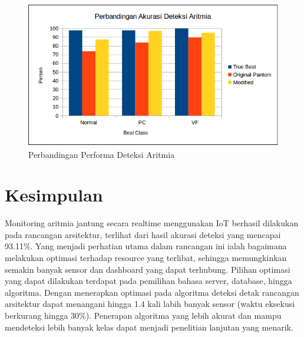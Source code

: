 \documentclass[]{indojc}
\begin{document}
\begin{figure}[H]
\centerline{\includegraphics[scale=0.41]{images/aritmia_acc.png}}
\caption{Perbandingan Performa Deteksi Aritmia}
\label{fig:aritmia_acc}
\end{figure}

\section{Kesimpulan}
Monitoring aritmia jantung secara realtime menggunakan IoT berhasil dilakukan pada rancangan arsitektur, terlihat dari hasil akurasi deteksi yang mencapai 93.11\%. Yang menjadi perhatian utama dalam rancangan ini ialah bagaimana melakukan optimasi terhadap resource yang terlibat, sehingga memungkinkan semakin banyak sensor dan dashboard yang dapat terhubung. Pilihan optimasi yang dapat dilakukan terdapat pada pemilihan bahasa server, database, hingga algoritma. Dengan menerapkan optimasi pada algoritma deteksi detak rancangan arsitektur dapat menangani hingga 1.4 kali labih banyak sensor (waktu eksekusi berkurang hingga 30\%). Penerapan algoritma yang lebih akurat dan mampu mendeteksi lebih banyak kelas dapat menjadi penelitian lanjutan yang menarik.



{}
\end{document}
